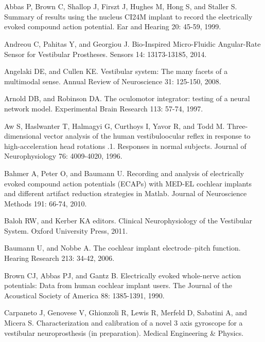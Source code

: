 \manualmark
\markboth{\spacedlowsmallcaps{\bibname}}{\spacedlowsmallcaps{\bibname}} %
\chapter*{\bibname}\label{app:bibliography}
{\footnotesize
\indent Abbas P, Brown C, Shallop J, Firszt J, Hughes M, Hong S, and Staller S. Summary of results using the nucleus CI24M implant to record the electrically evoked compound action potential. Ear and Hearing 20: 45-59, 1999.

Andreou C, Pahitas Y, and Georgiou J. Bio-Inspired Micro-Fluidic Angular-Rate Sensor for Vestibular Prostheses. Sensors 14: 13173-13185, 2014.

Angelaki DE, and Cullen KE. Vestibular system: The many facets of a multimodal sense. Annual Review of Neuroscience 31: 125-150, 2008.

Arnold DB, and Robinson DA. The oculomotor integrator: testing of a neural network model. Experimental Brain Research 113: 57-74, 1997.

Aw S, Haslwanter T, Halmagyi G, Curthoys I, Yavor R, and Todd M. Three-dimensional vector analysis of the human vestibuloocular reflex in response to high-acceleration head rotations .1. Responses in normal subjects. Journal of Neurophysiology 76: 4009-4020, 1996.

Bahmer A, Peter O, and Baumann U. Recording and analysis of electrically evoked compound action potentials (ECAPs) with MED-EL cochlear implants and different artifact reduction strategies in Matlab. Journal of Neuroscience Methods 191: 66-74, 2010.

Baloh RW, and Kerber KA editors. Clinical Neurophysiology of the Vestibular System. Oxford University Press, 2011.

Baumann U, and Nobbe A. The cochlear implant electrode–pitch function. Hearing Research 213: 34-42, 2006.

Brown CJ, Abbas PJ, and Gantz B. Electrically evoked whole-nerve action potentials: Data from human cochlear implant users. The Journal of the Acoustical Society of America 88: 1385-1391, 1990.

Carpaneto J, Genovese V, Ghionzoli R, Lewis R, Merfeld D, Sabatini A, and Micera S. Characterization and calibration of a novel 3 axis gyroscope for a vestibular neuroprosthesis (in preparation). Medical Engineering \& Physics.

}
